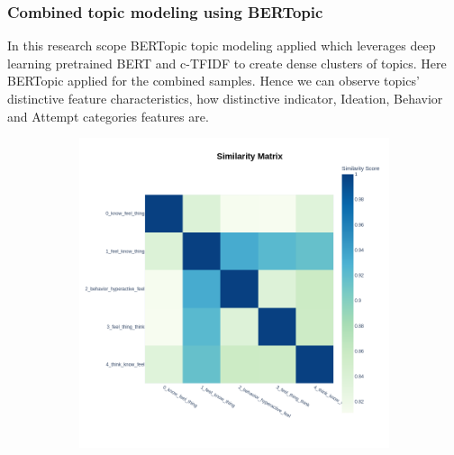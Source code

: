 \documentclass[sn-mathphys,Numbered]{sn-jnl}%
\theoremstyle{thmstyleone}%
\theoremstyle{thmstyletwo}%
\theoremstyle{thmstylethree}%
\begin{document}
\subsubsection{Combined topic modeling using BERTopic}
In this research scope BERTopic topic modeling applied which leverages deep learning pretrained BERT and c-TFIDF to create dense clusters of topics. Here BERTopic applied for the combined samples. Hence we can observe topics' distinctive feature characteristics, how distinctive indicator, Ideation, Behavior and Attempt categories features are.
\begin{figure}[h!]
\centering
\begin{subfigure}{0.45\textwidth}
    \includegraphics[width=\textwidth]{bertopic/combined_bertopic_topics_heatmap_frequency.png}
    \label{Redditdist}
\end{subfigure}
\hfill
\begin{subfigure}{0.45\textwidth}

\end{subfigure}
\end{figure}
\end{document}
